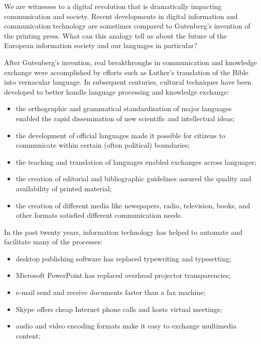 \begin{multicols}{2}
    We are witnesses to a digital revolution that is dramatically impacting communication and society. Recent developments in digital information and communication technology are sometimes compared to Gutenberg’s invention of the printing press. What can this analogy tell us about the future of the European information society and our languages in particular?


    After Gutenberg’s invention, real breakthroughs in communication and knowledge exchange were accomplished by efforts such as Luther’s translation of the Bible into vernacular language. In subsequent centuries, cultural techniques have been developed to better handle language processing and knowledge exchange:
    \begin{itemize}
      \item the orthographic and grammatical standardisation of major languages enabled the rapid dissemination of new 
      scientific and intellectual ideas;
      \item the development of official languages made it possible for citizens to communicate within certain (often 
      political) boundaries;
      \item the teaching and translation of languages enabled exchanges across languages;
      \item the creation of editorial and bibliographic guidelines assured the quality and availability of printed 
      material;
      \item the creation of different media like newspapers, radio, television, books, and other formats satisfied 
      different communication needs. 
    \end{itemize}
    In the past twenty years, information technology has helped to automate and facilitate many of the processes:
    \begin{itemize}
      \item desktop publishing software has replaced typewriting and typesetting;
      \item Microsoft PowerPoint has replaced overhead projector transparencies;
      \item e-mail send and receive documents faster than a fax machine;
      \item Skype offers cheap Internet phone calls and hosts virtual meetings;
      \item audio and video encoding formats make it easy to exchange multimedia content;

\end{itemize}
\end{multicols}
